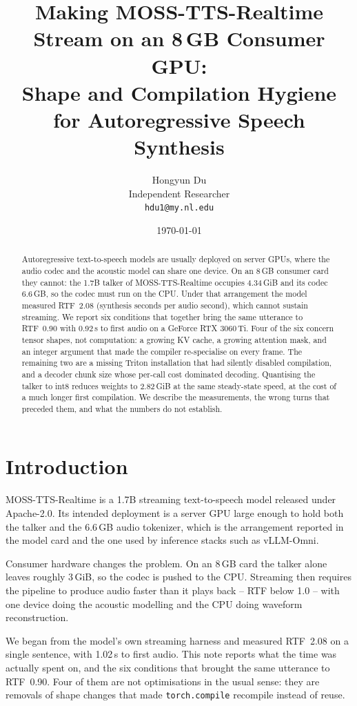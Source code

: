\documentclass[11pt]{article}
\title{Making MOSS-TTS-Realtime Stream on an 8\,GB Consumer GPU:\\
Shape and Compilation Hygiene for Autoregressive Speech Synthesis}
\author{Hongyun Du\\Independent Researcher\\\texttt{hdu1@my.nl.edu}}
\date{\today}
\begin{document}
\maketitle

\begin{abstract}
Autoregressive text-to-speech models are usually deployed on server GPUs, where the audio codec and the acoustic
model can share one device. On an 8\,GB consumer card they cannot: the 1.7B talker of MOSS-TTS-Realtime occupies
4.34\,GiB and its codec 6.6\,GB, so the codec must run on the CPU. Under that arrangement the model measured
RTF~2.08 (synthesis seconds per audio second), which cannot sustain streaming. We report six conditions that
together bring the same utterance to RTF~0.90 with 0.92\,s to first audio on a GeForce RTX 3060\,Ti. Four of the
six concern tensor shapes, not computation: a growing KV cache, a growing attention mask, and an integer argument
that made the compiler re-specialise on every frame. The remaining two are a missing Triton installation that had
silently disabled compilation, and a decoder chunk size whose per-call cost dominated decoding. Quantising the
talker to int8 reduces weights to 2.82\,GiB at the same steady-state speed, at the cost of a much longer first
compilation. We describe the measurements, the wrong turns that preceded them, and what the numbers do not
establish.
\end{abstract}

\section{Introduction}

MOSS-TTS-Realtime is a 1.7B streaming text-to-speech model released under Apache-2.0. Its intended deployment is a
server GPU large enough to hold both the talker and the 6.6\,GB audio tokenizer, which is the arrangement reported
in the model card and the one used by inference stacks such as vLLM-Omni.

Consumer hardware changes the problem. On an 8\,GB card the talker alone leaves roughly 3\,GiB, so the codec is
pushed to the CPU. Streaming then requires the pipeline to produce audio faster than it plays back -- RTF below
1.0 -- with one device doing the acoustic modelling and the CPU doing waveform reconstruction.

We began from the model's own streaming harness and measured RTF~2.08 on a single sentence, with 1.02\,s to first
audio. This note reports what the time was actually spent on, and the six conditions that brought the same
utterance to RTF~0.90. Four of them are not optimisations in the usual sense: they are removals of shape changes
that made \texttt{torch.compile} recompile instead of reuse.
\end{document}
